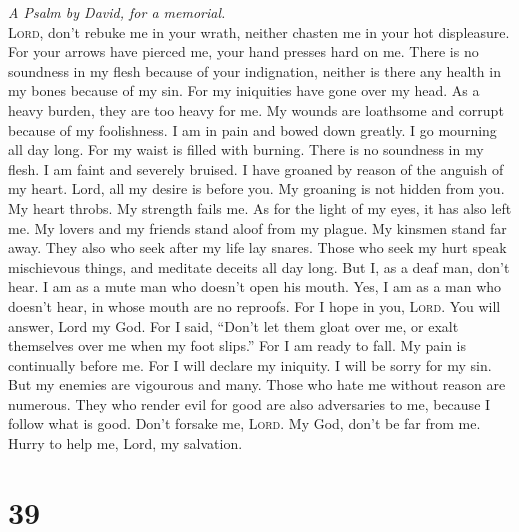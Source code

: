\emph{A Psalm by David, for a memorial.}\\
 \textsc{Lord}, don't rebuke me in your wrath, neither
chasten me in your hot displeasure.  For your arrows have
pierced me, your hand presses hard on me.  There is no
soundness in my flesh because of your indignation, neither is there any
health in my bones because of my sin.  For my iniquities
have gone over my head. As a heavy burden, they are too heavy for me.
 My wounds are loathsome and corrupt because of my
foolishness.  I am in pain and bowed down greatly. I go
mourning all day long.  For my waist is filled with
burning. There is no soundness in my flesh.  I am faint
and severely bruised. I have groaned by reason of the anguish of my
heart.  Lord, all my desire is before you. My groaning is
not hidden from you.  My heart throbs. My strength fails
me. As for the light of my eyes, it has also left me.  My
lovers and my friends stand aloof from my plague. My kinsmen stand far
away.  They also who seek after my life lay snares. Those
who seek my hurt speak mischievous things, and meditate deceits all day
long.  But I, as a deaf man, don't hear. I am as a mute
man who doesn't open his mouth.  Yes, I am as a man who
doesn't hear, in whose mouth are no reproofs.  For I hope
in you, \textsc{Lord}. You will answer, Lord my God.  For
I said, ``Don't let them gloat over me, or exalt themselves over me when
my foot slips.''  For I am ready to fall. My pain is
continually before me.  For I will declare my iniquity. I
will be sorry for my sin.  But my enemies are vigourous
and many. Those who hate me without reason are numerous. 
They who render evil for good are also adversaries to me, because I
follow what is good.  Don't forsake me, \textsc{Lord}. My
God, don't be far from me.  Hurry to help me, Lord, my
salvation.

\hypertarget{section-38}{%
\section{39}\label{section-38}}

